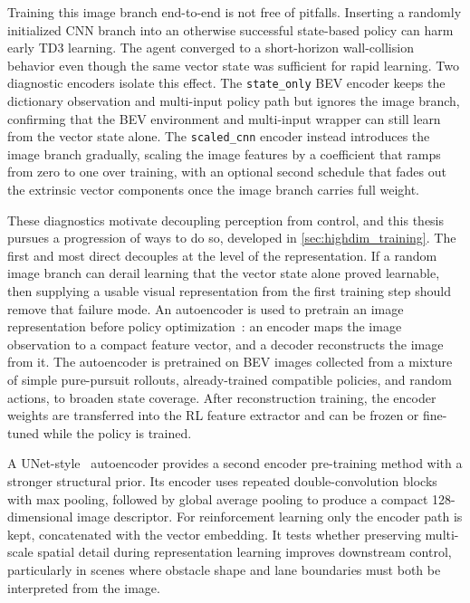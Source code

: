 Training this image branch end-to-end is not free of pitfalls. Inserting a randomly initialized CNN branch into an otherwise successful state-based policy can harm early TD3 learning. The agent converged to a short-horizon wall-collision behavior even though the same vector state was sufficient for rapid learning. Two diagnostic encoders isolate this effect. The \texttt{state\_only} BEV encoder keeps the dictionary observation and multi-input policy path but ignores the image branch, confirming that the BEV environment and multi-input wrapper can still learn from the vector state alone. The \texttt{scaled\_cnn} encoder instead introduces the image branch gradually, scaling the image features by a coefficient that ramps from zero to one over training, with an optional second schedule that fades out the extrinsic vector components once the image branch carries full weight.

These diagnostics motivate decoupling perception from control, and this thesis pursues a progression of ways to do so, developed in \cref{sec:highdim_training}. The first and most direct decouples at the level of the representation. If a random image branch can derail learning that the vector state alone proved learnable, then supplying a usable visual representation from the first training step should remove that failure mode. An autoencoder is used to pretrain an image representation before policy optimization~\cite{lange2010deep}: an encoder maps the image observation to a compact feature vector, and a decoder reconstructs the image from it. The autoencoder is pretrained on BEV images collected from a mixture of simple pure-pursuit rollouts, already-trained compatible policies, and random actions, to broaden state coverage. After reconstruction training, the encoder weights are transferred into the RL feature extractor and can be frozen or fine-tuned while the policy is trained.

A UNet-style~\cite{ronneberger2015unet} autoencoder provides a second encoder pre-training method with a stronger structural prior. Its encoder uses repeated double-convolution blocks with max pooling, followed by global average pooling to produce a compact 128-dimensional image descriptor. For reinforcement learning only the encoder path is kept, concatenated with the vector embedding. It tests whether preserving multi-scale spatial detail during representation learning improves downstream control, particularly in scenes where obstacle shape and lane boundaries must both be interpreted from the image.

